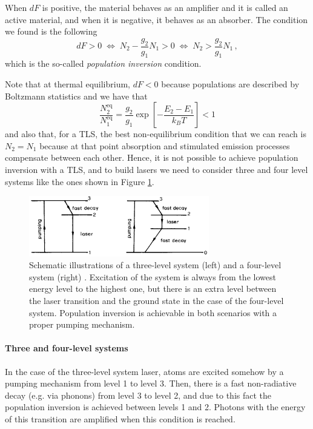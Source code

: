 \documentclass[11pt,a4paper]{article}
\begin{document}
When $dF$ is positive, the material behaves as an amplifier and it is called an active material, and when it is negative, it behaves as an absorber. The condition we found is the following
\begin{equation}
dF>0\;\Leftrightarrow\;N_2-\frac{g_2}{g_1}N_1>0\;\Leftrightarrow\;N_2>\frac{g_2}{g_1}N_1\,,
\end{equation}
which is the so-called \emph{population inversion} condition.

Note that at thermal equilibrium, $dF<0$ because populations are described by Boltzmann statistics and we have that
\begin{equation}
\frac{N_2^\text{eq}}{N_1^\text{eq}}=\frac{g_2}{g_1}\exp\left[-\frac{E_2-E_1}{k_BT}\right]<1
\end{equation}
and also that, for a TLS, the best non-equilibrium condition that we can reach is $N_2=N_1$ because at that point absorption and stimulated emission processes compensate between each other. Hence, it is not possible to achieve population inversion with a TLS, and to build lasers we need to consider three and four level systems like the ones shown in Figure \ref{fig:3LS-4LS}.

\begin{figure}[ht]
\centering
\includegraphics[width=0.7\textwidth]{3LS-4LS}
\caption{Schematic illustrations of a three-level system (left) and a four-level system (right) \cite{svelto2010principles}. Excitation of the system is always from the lowest energy level to the highest one, but there is an extra level between the laser transition and the ground state in the case of the four-level system. Population inversion is achievable in both scenarios with a proper pumping mechanism.}
\label{fig:3LS-4LS}
\end{figure}

\paragraph{Three and four-level systems}
In the case of the three-level system laser, atoms are excited somehow by a pumping mechanism from level 1 to level 3. Then, there is a fast non-radiative decay (e.g. via phonons) from level 3 to level 2, and due to this fact the population inversion is achieved between levels 1 and 2. Photons with the energy of this transition are amplified when this condition is reached.
\end{document}
